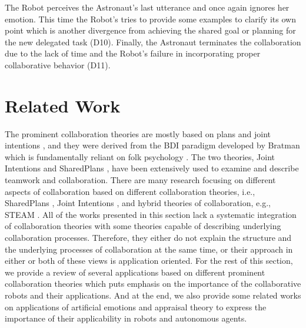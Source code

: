 The Robot perceives the Astronaut's last utterance and once again ignores her
emotion. This time the Robot's tries to provide some examples to clarify its own
point which is another divergence from achieving the shared goal or planning for
the new delegated task (D10). Finally, the Astronaut terminates the
collaboration due to the lack of time and the Robot's failure in incorporating
proper collaborative behavior (D11).\\

\noindent{}

\section{Related Work}
\label{sec:related-work}

The prominent collaboration theories are mostly based on plans and joint
intentions
\cite{cohen:teamwork,grosz:plans-discourse,Litman:discourse-commonsense}, and
they were derived from the BDI paradigm developed by Bratman
\cite{bratman:intentions-plans} which is fundamentally reliant on folk
psychology \cite{ravenscroft:folk}. The two theories, Joint Intentions
\cite{cohen:teamwork} and SharedPlans \cite{grosz:plans-discourse}, have been
extensively used to examine and describe teamwork and collaboration. There are
many research focusing on different aspects of collaboration based on different
collaboration theories, i.e., SharedPlans
\cite{grosz:planning-acting,grosz:collaboration,grosz:plans-discourse}, Joint
Intentions \cite{cohen:teamwork}, and hybrid theories of collaboration, e.g.,
STEAM \cite{tambe:flexible-teamwork}. All of the works presented in this section
lack a systematic integration of collaboration theories with some theories
capable of describing underlying collaboration processes. Therefore, they
either do not explain the structure and the underlying processes of
collaboration at the same time, or their approach in either or both
of these views is application oriented. For the rest of this section, we provide
a review of several applications based on different prominent collaboration
theories which puts emphasis on the importance of the collaborative robots and
their applications. And at the end, we also provide some related works on
applications of artificial emotions and appraisal theory to express the
importance of their applicability in robots and autonomous agents.


